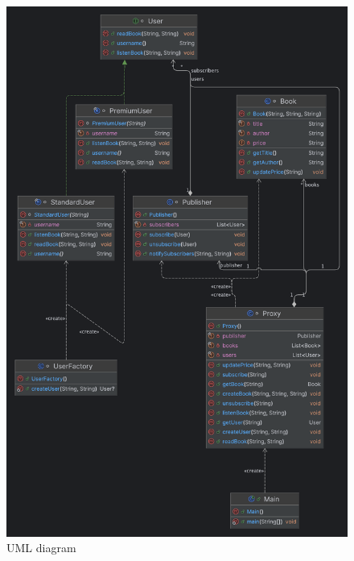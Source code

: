 \documentclass{report}
\begin{document}
\newpage
\begin{figure}[h]
    \centering
    \includegraphics[width=\textwidth]{UML.png}
    \caption{UML diagram}
\end{figure}
\end{document}
